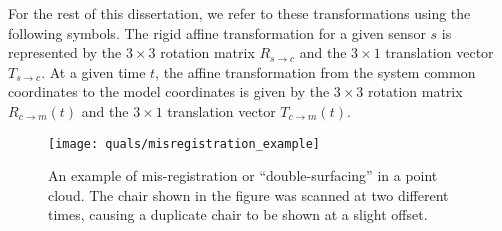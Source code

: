 \documentclass[12pt,onecolumn,oneside]{book}
\begin{document}
For the rest of this dissertation, we refer to these transformations using the following symbols.  The rigid affine transformation for a given sensor $s$ is represented by the $3 \times 3$ rotation matrix $R_{s\rightarrow c}$ and the $3 \times 1$ translation vector $T_{s\rightarrow c}$.  At a given time $t$, the affine transformation from the system common coordinates to the model coordinates is given by the $3 \times 3$ rotation matrix $R_{c\rightarrow m}(t)$ and the $3 \times 1$ translation vector $T_{c\rightarrow m}(t)$. 


\begin{figure}
	\centerline{\texttt{[image: quals/misregistration\_example]}}
	\caption[An example of mis-registration or ``double-surfacing'' in a point cloud.]{An example of mis-registration or ``double-surfacing'' in a point cloud.   The chair shown in the figure was scanned at two different times, causing a duplicate chair to be shown at a slight offset.}
	\label{fig:double_surface}
\end{figure}
\end{document}
